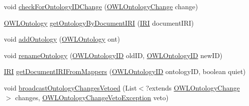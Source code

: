 \begin{DoxyCompactItemize}
\item 
void \hyperlink{classuk_1_1ac_1_1manchester_1_1cs_1_1owl_1_1owlapi_1_1_o_w_l_ontology_manager_impl_afe8a84c8d3fe0fdd0ddf22186e47d0b1}{check\-For\-Ontology\-I\-D\-Change} (\hyperlink{classorg_1_1semanticweb_1_1owlapi_1_1model_1_1_o_w_l_ontology_change}{O\-W\-L\-Ontology\-Change} change)
\item 
\hyperlink{interfaceorg_1_1semanticweb_1_1owlapi_1_1model_1_1_o_w_l_ontology}{O\-W\-L\-Ontology} \hyperlink{classuk_1_1ac_1_1manchester_1_1cs_1_1owl_1_1owlapi_1_1_o_w_l_ontology_manager_impl_a4993c1f46c5e9bb2410b60f66dfdce15}{get\-Ontology\-By\-Document\-I\-R\-I} (\hyperlink{classorg_1_1semanticweb_1_1owlapi_1_1model_1_1_i_r_i}{I\-R\-I} document\-I\-R\-I)
\item 
void \hyperlink{classuk_1_1ac_1_1manchester_1_1cs_1_1owl_1_1owlapi_1_1_o_w_l_ontology_manager_impl_a1dd79bce2f9f107c022699622a792653}{add\-Ontology} (\hyperlink{interfaceorg_1_1semanticweb_1_1owlapi_1_1model_1_1_o_w_l_ontology}{O\-W\-L\-Ontology} ont)
\item 
void \hyperlink{classuk_1_1ac_1_1manchester_1_1cs_1_1owl_1_1owlapi_1_1_o_w_l_ontology_manager_impl_abf3ea9133e3c3f8a586f4623ce20c23c}{rename\-Ontology} (\hyperlink{classorg_1_1semanticweb_1_1owlapi_1_1model_1_1_o_w_l_ontology_i_d}{O\-W\-L\-Ontology\-I\-D} old\-I\-D, \hyperlink{classorg_1_1semanticweb_1_1owlapi_1_1model_1_1_o_w_l_ontology_i_d}{O\-W\-L\-Ontology\-I\-D} new\-I\-D)
\item 
\hyperlink{classorg_1_1semanticweb_1_1owlapi_1_1model_1_1_i_r_i}{I\-R\-I} \hyperlink{classuk_1_1ac_1_1manchester_1_1cs_1_1owl_1_1owlapi_1_1_o_w_l_ontology_manager_impl_a1f3c2bdba52f20b1b7e0175dc8255a5e}{get\-Document\-I\-R\-I\-From\-Mappers} (\hyperlink{classorg_1_1semanticweb_1_1owlapi_1_1model_1_1_o_w_l_ontology_i_d}{O\-W\-L\-Ontology\-I\-D} ontology\-I\-D, boolean quiet)
\item 
void \hyperlink{classuk_1_1ac_1_1manchester_1_1cs_1_1owl_1_1owlapi_1_1_o_w_l_ontology_manager_impl_af0e573cab058fc345a45b110105a1c37}{broadcast\-Ontology\-Changes\-Vetoed} (List$<$?extends \hyperlink{classorg_1_1semanticweb_1_1owlapi_1_1model_1_1_o_w_l_ontology_change}{O\-W\-L\-Ontology\-Change} $>$ changes, \hyperlink{classorg_1_1semanticweb_1_1owlapi_1_1model_1_1_o_w_l_ontology_change_veto_exception}{O\-W\-L\-Ontology\-Change\-Veto\-Exception} veto)
\end{DoxyCompactItemize}
